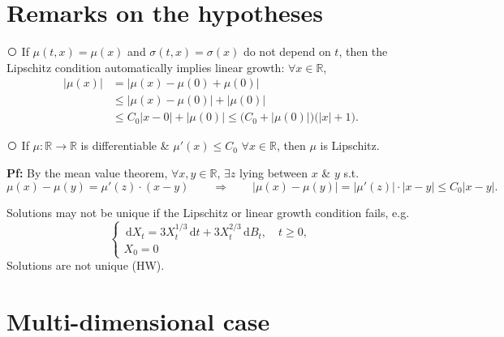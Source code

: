 \documentclass[11pt]{article}
\newcommand{\R}{\mathbb{R}}
\newcommand{\dd}{\,\mathrm{d}}
\newcommand{\cnum}[1]{\textcircled{\raisebox{-0.6pt}{\scriptsize #1}}} %
\theoremstyle{definition}
\theoremstyle{plain}
\begin{document}
\section{Remarks on the hypotheses}

\noindent\cnum{1} If $\mu(t,x)=\mu(x)$ and $\sigma(t,x)=\sigma(x)$ do not depend on
$t$, then the Lipschitz condition automatically implies linear growth:
$\forall x\in\R$,
\begin{align*}
  |\mu(x)|
    &=|\mu(x)-\mu(0)+\mu(0)|\\
    &\le|\mu(x)-\mu(0)|+|\mu(0)|\\
    &\le C_0|x-0|+|\mu(0)|\le\bigl(C_0+|\mu(0)|\bigr)\bigl(|x|+1\bigr).
\end{align*}

\medskip
\noindent\cnum{2} If $\mu:\R\to\R$ is differentiable \& $\mu'(x)\le C_0$ $\forall x\in\R$,
then $\mu$ is Lipschitz.

\noindent\textbf{Pf:} By the mean value theorem, $\forall x,y\in\R$, $\exists z$ lying
between $x$ \& $y$ s.t.
\[
  \mu(x)-\mu(y)=\mu'(z)\cdot(x-y)
  \qquad\Longrightarrow\qquad
  |\mu(x)-\mu(y)|=|\mu'(z)|\cdot|x-y|\le C_0|x-y| .
\]

\medskip
\noindent Solutions may not be unique if the Lipschitz or linear growth condition
fails, e.g.
\[
  \begin{cases}
    \dd X_t=3X_t^{1/3}\dd t+3X_t^{2/3}\dd B_t, \quad t\ge0,\\[2pt]
    X_0=0
  \end{cases}
\]
Solutions are not unique (HW).

\section{Multi-dimensional case}
\end{document}
